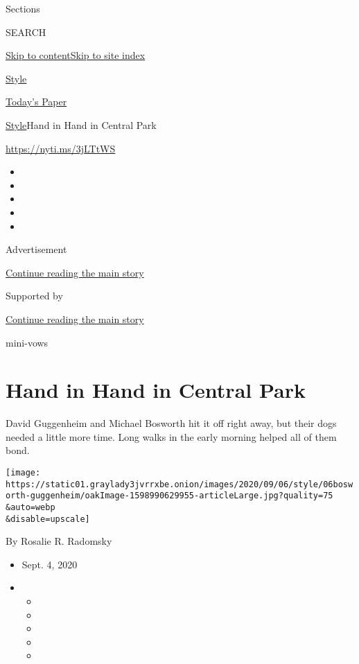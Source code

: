 Sections

SEARCH

\protect\hyperlink{site-content}{Skip to
content}\protect\hyperlink{site-index}{Skip to site index}

\href{https://www.nytimes3xbfgragh.onion/section/style}{Style}

\href{https://myaccount.nytimes3xbfgragh.onion/auth/login?response_type=cookie\&client_id=vi}{}

\href{https://www.nytimes3xbfgragh.onion/section/todayspaper}{Today's
Paper}

\href{/section/style}{Style}\textbar{}Hand in Hand in Central Park

\url{https://nyti.ms/3jLTtWS}

\begin{itemize}
\item
\item
\item
\item
\item
\end{itemize}

Advertisement

\protect\hyperlink{after-top}{Continue reading the main story}

Supported by

\protect\hyperlink{after-sponsor}{Continue reading the main story}

mini-vows

\hypertarget{hand-in-hand-in-central-park}{%
\section{Hand in Hand in Central
Park}\label{hand-in-hand-in-central-park}}

David Guggenheim and Michael Bosworth hit it off right away, but their
dogs needed a little more time. Long walks in the early morning helped
all of them bond.

\texttt{[image: https://static01.graylady3jvrrxbe.onion/images/2020/09/06/style/06bosworth-guggenheim/oakImage-1598990629955-articleLarge.jpg?quality=75\\\&auto=webp\\\&disable=upscale]}

By Rosalie R. Radomsky

\begin{itemize}
\item
  Sept. 4, 2020
\item
  \begin{itemize}
  \item
  \item
  \item
  \item
  \item
  \end{itemize}
\end{itemize}

